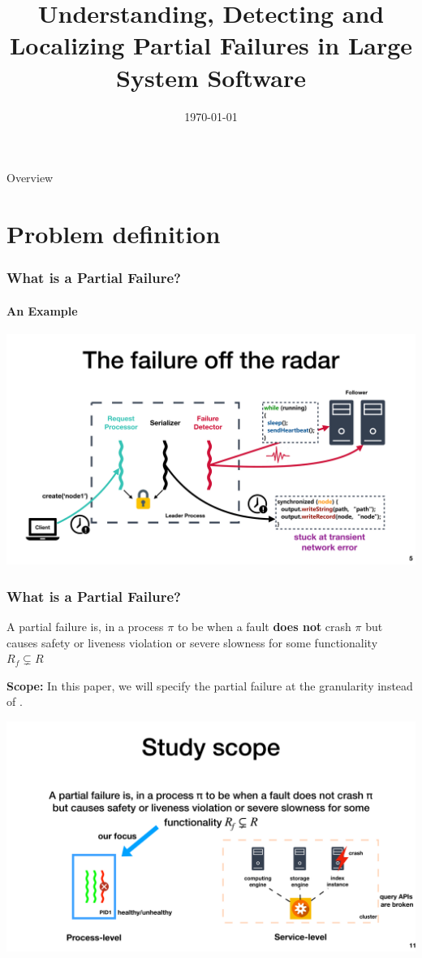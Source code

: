 \documentclass[aspectratio=169]{beamer}
\title{Understanding, Detecting and Localizing Partial Failures in Large System Software\footfullcite{lou2020understanding}}
\date{\today}
\newcommand{\red}[1]{{\color{red}{#1}}}
\newcommand{\blue}[1]{{\color{blue}{#1}}}
\begin{document}
\begin{frame}
    \titlepage
\end{frame}

\begin{frame}{Overview}
    \tableofcontents
\end{frame}

\section{Problem definition}

\begin{frame}
    \frametitle{What is a Partial Failure?}
    \framesubtitle{An Example}
    \begin{center}
        \includegraphics[width=\textwidth]{fig/example1.pdf}
    \end{center}
\end{frame}

\begin{frame}
    \frametitle{What is a Partial Failure?}
    \begin{definition}
        A partial failure is, in a process $\pi$ to be when a fault \textbf{does not} crash $\pi$ but causes safety or liveness violation or severe slowness for some functionality $R_f \subsetneq  R$

    \end{definition}
    \textbf{Scope:} In this paper, we will specify the partial failure at the \red{process} granularity instead of \blue{service}.
    \begin{center}
        \includegraphics[width=.9\textwidth]{fig/level}
    \end{center}
\end{frame}
\end{document}
